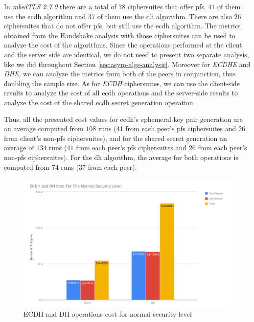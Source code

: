 \documentclass{llncs}
\begin{document}
In \textit{mbedTLS 2.7.0} there are a total of $78$ ciphersuites that offer \gls{pfs}. $41$ of them use the \gls{ecdh} algorithm and $37$ of them use
the \gls{dh} algorithm. There are also $26$ ciphersuites that do not offer \gls{pfs}, but still use the \gls{ecdh} algorithm. The metrics obtained from the
Handshake analysis with those ciphersuites can be used to analyze the cost of the algorithms. Since the operations performed at the client and
the server side are identical, we do not need to present two separate analysis, like we did throughout Section \ref{sec:asym-algs-analysis}.
Moreover for \textit{ECDHE} and \textit{DHE}, we can analyze the metrics from both  of the peers in conjunction, thus doubling the sample size.
As for \textit{ECDH} ciphersuites, we can use the client-side results to analyze the cost of all \gls{ecdh} operations and the server-side results
to analyze the cost of the shared \gls{ecdh} secret generation operation.

Thus, all the presented cost values for \gls{ecdh}'s ephemeral key pair generation are an average computed from $108$ runs ($41$ from each
peer's \gls{pfs} ciphersuites and $26$ from client's non-\gls{pfs} ciphersuites),
and for the shared secret generation an average of $134$ runs ($41$ from each peer's \gls{pfs} ciphersuites and $26$ from each peer's non-\gls{pfs}
ciphersuites). For the \gls{dh} algorithm, the average for both operations is computed from $74$ runs ($37$ from each peer).

\begin{figure}
  \centering
  \includegraphics[width=1.0\textwidth]{img/ecdh-dh-cost-normal-sl.png}
  \centering \caption{\label{fig:ecdh-dh-cost-normal-sl} ECDH and DH operations cost for normal security level}
\end{figure}
\end{document}
